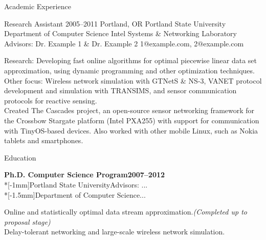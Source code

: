 \documentclass[12pt]{article}
\newcommand{\ispace}{\hspace*{0mm}}
\newcommand{\basicitem}[6]{
	{\bfseries #1}\hfill{\bfseries #2}
  \\*[-1mm]{\scriptsize #3\hfill{#5}}
	\\*[-1.5mm]{\scriptsize #4\hfill{#6}}
}
\begin{document}
\begin{resumeblock}{Academic Experience}

\resumeitemshort
	{Research Assistant}
	{2005--2011}
	{Portland, OR}
  {Portland State University Department of Computer Science}
	{Intel Systems \& Networking Laboratory}
	{Advisors: Dr. Example 1 \& Dr. Example 2}
	{1@example.com, 2@example.com}\\[-0.1in]
\par{
Research: Developing fast online algorithms for optimal piecewise linear data set approximation, using dynamic programming and other optimization techniques. \\
Other focus: Wireless network simulation with GTNetS \& NS-3, VANET protocol development and simulation with TRANSIMS, and sensor communication protocols for reactive sensing.\\
Created The Cascades project, an open-source sensor networking framework for the Crossbow Stargate platform (Intel PXA255) with support for communication with TinyOS-based devices. Also worked with other mobile Linux, such as Nokia tablets and smartphones.\\
\par}
\end{resumeblock}\vspace*{1em}
\newpage

\begin{resumeblock}{Education}

\basicitem
	{Ph.D. Computer Science Program}
	{2007--2012}
	{Portland State University}
	{Department of Computer Science}
	{Advisors: ...}
	{...}\\[-0.15in]

\par
{\addtolength{\leftskip}{0.25in}\addtolength{\rightskip}{0.25in}
Online and statistically optimal data stream approximation.\hfill{\textit {\tiny (Completed up to proposal stage)}}\\
\ispace Delay-tolerant networking and large-scale wireless network simulation.\\[-0.03in]
\par }
\end{resumeblock}
\end{document}
